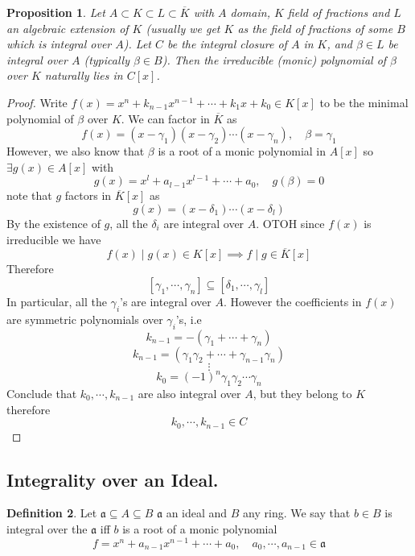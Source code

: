 \documentclass[11pt,a4paper]{article}
\theoremstyle{definition}
\newtheorem{definition}{Definition}[section]
\theoremstyle{plain}
\newtheorem{proposition}[definition]{Proposition}
\theoremstyle{remark}
\begin{document}
\begin{proposition}
    Let $A \subset K \subset L \subset \overline{K}$ with $A$ domain, $K$ field of fractions and $L$ an algebraic extension of $K$ 
    (usually we get $K$ as the field of fractions of some $B$ which is integral over $A$). Let $C$ be the integral closure of $A$ in $K$, and 
    $\beta \in L$ be integral over $A$ (typically $\beta \in B$). Then the irreducible (monic) polynomial of $\beta$ over $K$ naturally lies in $C[x]$.
\end{proposition}

\begin{proof}
    Write $f(x) = x^n + k_{n-1} x^{n-1} + \cdots + k_1x + k_0 \in K[x]$ to be the minimal polynomial of $\beta$ over $K$. We can factor in $\overline{K}$ as 
    $$f(x) = (x- \gamma_1) (x- \gamma_2) \cdots (x-\gamma_n), \quad \beta = \gamma_1$$
    However, we also know that $\beta$ is a root of a monic polynomial in $A[x]$ so $\exists g(x) \in A[x]$ with 
    $$g(x) = x^l + a_{l-1} x^{l-1} + \cdots + a_0, \quad g(\beta) = 0$$
    note that $g$ factors in $\overline{K}[x]$ as 
    $$g(x) = (x-\delta_1) \cdots (x-\delta_l)$$
    By the existence of $g$, all the $\delta_i$ are integral over $A$. OTOH since $f(x)$ is irreducible we have 
    $$f(x) \mid g(x) \in K[x] \implies f \mid g \in \overline{K}[x]$$
    Therefore 
    $$[\gamma_1, \cdots, \gamma_n] \subseteq [\delta_1,\cdots, \gamma_l]$$
    In particular, all the $\gamma_i$'s are integral over $A$. However the coefficients in $f(x)$ are symmetric polynomials over $\gamma_i$'s, i.e 
    $$k_{n-1} = -(\gamma_1 + \cdots + \gamma_n)$$
    $$k_{n-1} = (\gamma_1 \gamma_2 + \cdots + \gamma_{n-1}\gamma_n)$$
    $$\vdots$$
    $$k_0 = (-1)^n \gamma_1 \gamma_2 \cdots \gamma_n$$
    Conclude that $k_0, \cdots, k_{n-1}$ are also integral over $A$, but they belong to $K$ therefore 
    $$k_0, \cdots, k_{n-1} \in C$$ 
\end{proof}

\subsection{Integrality over an Ideal.} 
\begin{definition}
    Let $\mathfrak{a} \subseteq A \subseteq B$ $\mathfrak{a}$ an ideal and $B$ any ring. We say that $b \in B$ is integral over the $\mathfrak{a}$ iff $b$ is a 
    root of a monic polynomial 
    $$f = x^n + a_{n-1} x^{n-1} + \cdots + a_0, \quad a_0, \cdots, a_{n-1} \in \mathfrak{a}$$ 
\end{definition}
\end{document}
